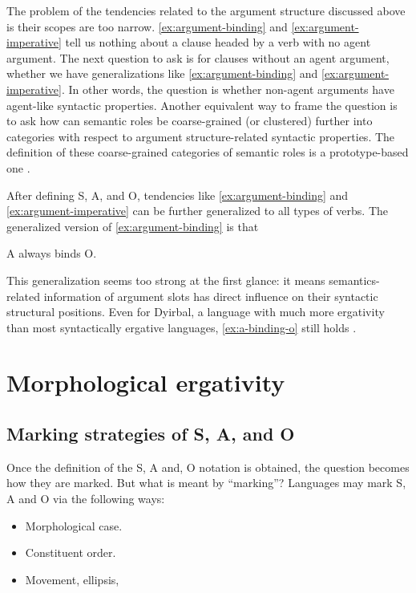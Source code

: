 \documentclass{article}
\newcommand*{\citesec}[1]{\S~{#1}}
\begin{document}
The problem of the tendencies related to the argument structure discussed above 
is their scopes are too narrow.
\eqref{ex:argument-binding} and \eqref{ex:argument-imperative} tell us nothing about 
a clause headed by a verb with no agent argument.
The next question to ask is for clauses without an agent argument,
whether we have generalizations like \eqref{ex:argument-binding} and \eqref{ex:argument-imperative}.
In other words, the question is whether non-agent arguments have agent-like syntactic properties.
Another equivalent way to frame the question is to ask 
how can semantic roles be coarse-grained (or clustered) further into categories 
with respect to argument structure-related syntactic properties.
The definition of these coarse-grained categories of semantic roles is a prototype-based one
\citep[\citesec{5.2}]{comrie1989language}.

After defining S, A, and O, tendencies like \eqref{ex:argument-binding} and \eqref{ex:argument-imperative}
can be further generalized to all types of verbs.
The generalized version of \eqref{ex:argument-binding} is that 
\begin{exe} 
    \ex \label{ex:a-binding-o} A always binds O.
\end{exe}   
This generalization seems too strong at the first glance:
it means semantics-related information of argument slots has 
direct influence on their syntactic structural positions.
Even for Dyirbal, a language with much more ergativity than most syntactically ergative languages, 
\eqref{ex:a-binding-o} still holds \citep{van2003syntactic}.

\section{Morphological ergativity}\label{sec:morphologcal-ergativity}

\subsection{Marking strategies of S, A, and O}

Once the definition of the S, A and, O notation is obtained, 
the question becomes how they are marked.
But what is meant by ``marking''?
Languages may mark S, A and O via the following ways:
\begin{itemize} %
    \item Morphological case.
    \item Constituent order.
    \item Movement, ellipsis, 
\end{itemize}
\end{document}
